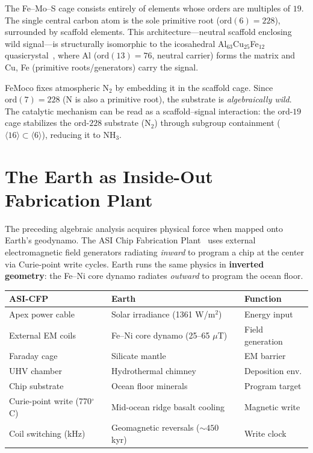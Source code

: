 \noindent The Fe--Mo--S cage consists entirely of elements whose orders are multiples of $19$. The single central carbon atom is the sole primitive root ($\mathrm{ord}(6) = 228$), surrounded by scaffold elements. This architecture---neutral scaffold enclosing wild signal---is structurally isomorphic to the icosahedral Al$_{63}$Cu$_{25}$Fe$_{12}$ quasicrystal~\cite{Shechtman84, TsaiGuo00}, where Al ($\mathrm{ord}(13) = 76$, neutral carrier) forms the matrix and Cu, Fe (primitive roots/generators) carry the signal.

FeMoco fixes atmospheric N$_2$ by embedding it in the scaffold cage. Since $\mathrm{ord}(7) = 228$ (N is also a primitive root), the substrate is \emph{algebraically wild}. The catalytic mechanism can be read as a scaffold--signal interaction: the ord-$19$ cage stabilizes the ord-$228$ substrate (N$_2$) through subgroup containment ($\langle 16 \rangle \subset \langle 6 \rangle$), reducing it to NH$_3$.

\section{The Earth as Inside-Out Fabrication Plant}\label{sec:earth}

The preceding algebraic analysis acquires physical force when mapped onto Earth's geodynamo. The ASI Chip Fabrication Plant~\cite{LaRue_PP} uses external electromagnetic field generators radiating \emph{inward} to program a chip at the center via Curie-point write cycles. Earth runs the same physics in \textbf{inverted geometry}: the Fe--Ni core dynamo radiates \emph{outward} to program the ocean floor.

\begin{center}
\begin{tabular}{@{}p{4cm}p{5cm}p{3.5cm}@{}}
\toprule
\textbf{ASI-CFP} & \textbf{Earth} & \textbf{Function} \\
\midrule
Apex power cable & Solar irradiance (1361 W/m$^2$) & Energy input \\
External EM coils & Fe--Ni core dynamo (25--65 $\mu$T) & Field generation \\
Faraday cage & Silicate mantle & EM barrier \\
UHV chamber & Hydrothermal chimney & Deposition env. \\
Chip substrate & Ocean floor minerals & Program target \\
Curie-point write (770$^\circ$C) & Mid-ocean ridge basalt cooling & Magnetic write \\
Coil switching (kHz) & Geomagnetic reversals (${\sim}450$ kyr) & Write clock \\
\bottomrule
\end{tabular}
\end{center}


